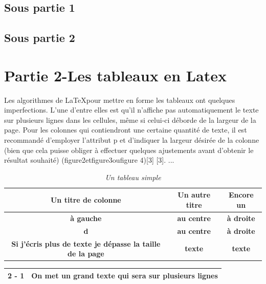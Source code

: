 \documentclass[12pt,a4paper, twoside]{article}
\begin{document}
\subsection{Sous partie 1}
\subsection{Sous partie 2}
\section{Partie 2-Les tableaux en Latex}

    Les algorithmes de \LaTeX pour mettre en forme les tableaux ont quelques imperfections. L’une d’entre elles est qu’il n’affiche pas automatiquement le texte sur plusieurs lignes dans les cellules, même si celui-ci déborde de la largeur de la page. Pour les colonnes qui contiendront une certaine quantité de texte, il est recommandé d’employer l’attribut p et d’indiquer la largeur désirée de la colonne (bien que cela puisse obliger à effectuer quelques ajustements avant d’obtenir le résultat souhaité) (figure2etfigure3oufigure 4)[3] [3]. ...

\begin{table}[h]
    \centering
    \begin{tabular}{|c|c|c|}
        \hline
        \textbf{Un titre de colonne} & \textbf{Un autre titre} & \textbf{Encore un} \\
        \hline
        \textbf{à gauche} & \textbf{au centre} & \textbf{à droite} \\
        \hline
        \textbf{d} & \textbf{au centre} & \textbf{à droite} \\
        \hline
        \textbf{Si j’écris plus de texte je dépasse la taille de la page} & \textbf{texte} & \textbf{texte} \\
        \hline
    \end{tabular}
    \caption{\emph{Un tableau simple}}
    \label{tab:test}
\end{table}

\newpage

\begin{center}
\begin{tabular}{|c|p{8cm}|}

\hline
2 - 1 & On met un grand texte qui sera sur plusieurs lignes \\
\hline
\end{tabular}
\end{center}
\end{document}
